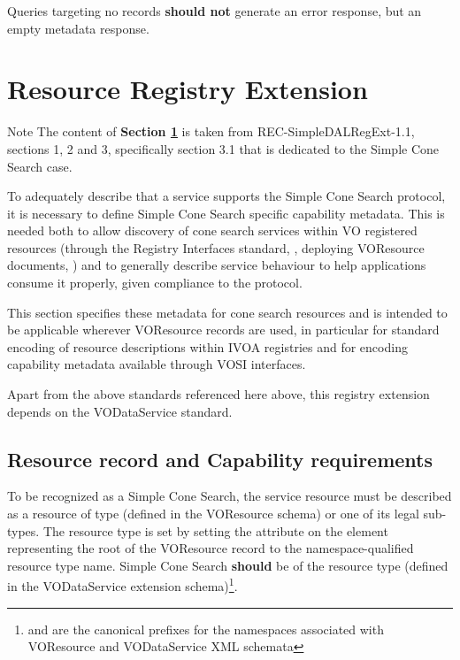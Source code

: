 \documentclass[11pt,a4paper]{ivoa}
\begin{document}
Queries targeting no records \textbf{should not} generate an error response, but an empty metadata response.

\section{Resource Registry Extension}
\label{sec:regext}

\begin{admonition}{Note}
The content of \textbf{Section \ref{sec:regext}} is taken from REC-SimpleDALRegExt-1.1, sections 1, 2 and 3, specifically section 3.1 that is dedicated to the Simple Cone Search case.
\end{admonition}

To adequately describe that a service supports the Simple Cone Search
protocol, it is necessary to define Simple Cone Search specific
capability metadata. This is needed both to allow discovery of cone
search services within VO registered resources (through the Registry
Interfaces standard, \citet{std:RI1}, deploying VOResource documents,
\citet{std:VOR}) and to generally describe service behaviour to help
applications consume it properly, given compliance to the protocol.

This section specifies these metadata for cone search resources and is
intended to be applicable wherever VOResource records are used, in
particular for standard encoding of resource descriptions within IVOA
registries and for encoding capability metadata available through VOSI
\citep{std:VOSI11} interfaces.

Apart from the above standards referenced here above, this registry
extension depends on the VODataService \citep{std:VODS11} standard.

\subsection{Resource record and Capability requirements}
To be recognized as a Simple Cone Search, the service resource must be described as a resource of type  (defined in the VOResource schema) or one of its legal sub-types. The resource type is set by setting the  attribute on the element representing the root of the VOResource record to the namespace-qualified resource type name. Simple Cone Search \textbf{should} be of the resource type  (defined in the VODataService extension schema)\footnote{ and  are the canonical prefixes for the namespaces associated with VOResource and VODataService XML schemata}. 
\end{document}
